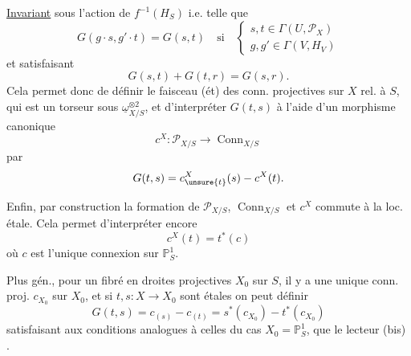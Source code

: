 \uline{Invariant} sous l'action de $f^{-1}(H_S)$ i.e. telle que
\[
G(g\cdot s,g'\cdot t)=G(s,t)\quad\text{si}\quad
\left\{\begin{array}{l}s,t\in\Gamma(U,\mathcal P_X)\\g,g'\in\Gamma(V,H_V)\end{array}\right.
\]
et satisfaisant
\[
G(s,t)+G(t,r)=G(s,r).
\]
Cela permet donc de définir le faisceau  (ét) des conn. projectives sur $X$ rel. à $S$, qui est un torseur sous $\underline\omega_{X/S}^{\otimes2}$, et d'interpréter $G(t,s)$ à l'aide d'un morphisme canonique
\[
c^X:\mathcal P_{X/S}\longrightarrow\operatorname{Conn}_{X/S}
\]
par
\[
G(t,s)=c^X_{\unsure{t}}(s)-c^X(t).
\]

Enfin, par construction la formation de $\mathcal P_{X/S}$, $\operatorname{Conn}_{X/S}$ et $c^X$ commute à la loc. étale. Cela permet d'interpréter encore
\[
c^X(t)=t^*(c)
\]
où $c$ est l'unique connexion sur $\mathbb P^1_S$.

Plus gén., pour un fibré en droites projectives $X_0$ sur $S$, il y a une unique conn. proj. $c_{X_0}$ sur $X_0$, et si $t,s:X\longrightarrow X_0$ sont étales on peut définir
\[
G(t,s)=c_{(s)}-c_{(t)}=s^*(c_{X_0})-t^*(c_{X_0})
\]
satisfaisant aux conditions analogues à celles du cas $X_0=\mathbb P^1_S$, que le lecteur (bis) .
